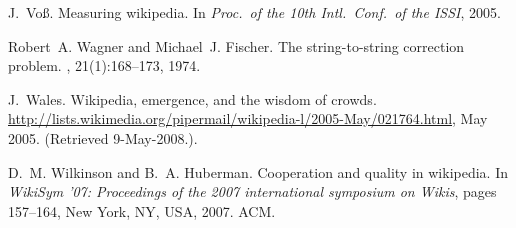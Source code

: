 \documentclass{sig-alternate}
\begin{document}
\begin{thebibliography}{10}
J.~Vo\ss{}.
\newblock Measuring wikipedia.
\newblock In {\em Proc.\ of the 10th Intl.\ Conf.\ of the ISSI}, 2005.

Robert~A. Wagner and Michael~J. Fischer.
\newblock The string-to-string correction problem.
, 21(1):168--173, 1974.

J.~Wales.
\newblock Wikipedia, emergence, and the wisdom of crowds.
\newblock
  \url{http://lists.wikimedia.org/pipermail/wikipedia-l/2005-May/021764.html},
  May 2005.
\newblock (Retrieved 9-May-2008.).

D.~M. Wilkinson and B.~A. Huberman.
\newblock Cooperation and quality in wikipedia.
\newblock In {\em WikiSym '07: Proceedings of the 2007 international symposium
  on Wikis}, pages 157--164, New York, NY, USA, 2007. ACM.

\end{thebibliography}
\end{document}
